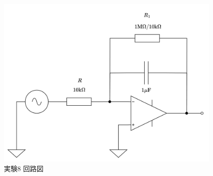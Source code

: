 \begin{figure}[!htb]
	\centering
	\includegraphics[width=0.8\linewidth]{src/figures/exp8/circuit.png}
	\caption{実験8 回路図}\label{fig:exp8-circuit}
\end{figure}
